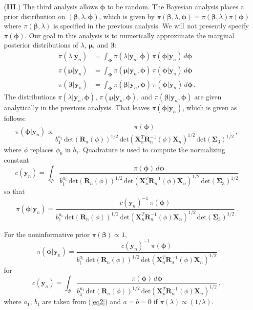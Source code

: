 \documentclass[11pt, oneside]{article}   	%
\begin{document}
({\bf III}.)  The third analysis allows $\mathbf{\phi}$ to be random.  The Bayesian analysis places a prior distribution on $(\mathbf{\beta}, \lambda, \mathbf{\phi})$, which is given by $\pi(\mathbf{\beta}, \lambda, \mathbf{\phi}) = \pi(\mathbf{\beta}, \lambda) \pi(\mathbf{\phi})$ where $\pi(\mathbf{\beta}, \lambda)$ is specified in the previous analysis.  We will not presently specify $\pi(\mathbf{\phi})$.  Our goal in this analysis is to numerically approximate the marginal posterior distributions of $\lambda$, $\mathbf{\mu}$, and $\mathbf{\beta}$:
\begin{align*}
\pi(\lambda | \mathbf{y}_n ) & = \int_\mathbf{\Phi} \pi(\lambda | \mathbf{y}_n, \mathbf{\phi}) \, \pi(\mathbf{\phi} | \mathbf{y}_n) \, d\mathbf{\phi} \\[1ex]
\pi(\mathbf{\mu} | \mathbf{y}_n ) & = \int_\mathbf{\Phi} \pi(\mathbf{\mu} | \mathbf{y}_n, \mathbf{\phi}) \, \pi(\mathbf{\phi} | \mathbf{y}_n) \, d\mathbf{\phi} \\[1ex]
\pi(\mathbf{\beta} | \mathbf{y}_n ) & = \int_\mathbf{\Phi} \pi(\mathbf{\beta} | \mathbf{y}_n, \mathbf{\phi}) \, \pi(\mathbf{\phi} | \mathbf{y}_n) \, d\mathbf{\phi} \,.
\end{align*}
The distributions $\pi(\lambda | \mathbf{y}_n, \mathbf{\phi})$, $\pi(\mathbf{\mu} | \mathbf{y}_n, \mathbf{\phi})$, and $\pi(\mathbf{\beta} | \mathbf{y}_n, \mathbf{\phi})$ are given analytically in the previous analysis.  That leaves $\pi(\mathbf{\phi} | \mathbf{y}_n)$, which is given as follows:
\[
\pi(\mathbf{\phi} | \mathbf{y}_n) \propto \frac{\pi(\mathbf{\phi})}{b_1^{a_1} \,\mbox{det}(\mathbf{R}_n(\phi))^{1/2} \, \mbox{det}(\mathbf{X}_n^T \mathbf{R}_n^{-1}(\phi) \mathbf{X}_n)^{1/2} \, \mbox{det}(\mathbf{\Sigma}_3)^{1/2}} \,,
\]
where $\phi$ replaces $\phi_0$ in $b_1$.  Quadrature is used to compute the normalizing constant
\[
c(\mathbf{y}_n) = \int_{\Phi} \frac{\pi(\mathbf{\phi}) \, d \mathbf{\phi}}{b_1^{a_1} \,\mbox{det}(\mathbf{R}_n(\phi))^{1/2} \, \mbox{det}(\mathbf{X}_n^T \mathbf{R}_n^{-1}(\phi) \mathbf{X}_n)^{1/2} \, \mbox{det}(\mathbf{\Sigma}_3)^{1/2}}
\]
so that
\[
\pi(\mathbf{\phi} | \mathbf{y}_n) = \frac{c(\mathbf{y}_n)^{-1} \, \pi(\mathbf{\phi})}{b_1^{a_1} \,\mbox{det}(\mathbf{R}_n(\phi))^{1/2} \, \mbox{det}(\mathbf{X}_n^T \mathbf{R}_n^{-1}(\phi) \mathbf{X}_n)^{1/2} \, \mbox{det}(\mathbf{\Sigma}_3)^{1/2}} \,.
\]

For the noninformative prior $\pi(\mathbf{\beta}) \propto 1$,
\[
\pi(\mathbf{\phi} | \mathbf{y}_n) = \frac{c(\mathbf{y}_n)^{-1} \, \pi(\mathbf{\phi})}{b_1^{a_1} \,\mbox{det}(\mathbf{R}_n(\phi))^{1/2} \, \mbox{det}(\mathbf{X}_n^T \mathbf{R}_n^{-1}(\phi) \mathbf{X}_n)^{1/2}}
\]
for
\[
c(\mathbf{y}_n) = \int_{\Phi} \frac{\pi(\mathbf{\phi}) \, d \mathbf{\phi}}{b_1^{a_1} \,\mbox{det}(\mathbf{R}_n(\phi))^{1/2} \, \mbox{det}(\mathbf{X}_n^T \mathbf{R}_n^{-1}(\phi) \mathbf{X}_n)^{1/2}} \,,
\]
where $a_1$, $b_1$ are taken from (\ref{eq2}) and $a = b = 0$ if $\pi(\lambda) \propto (1/\lambda)$. 
\end{document}

